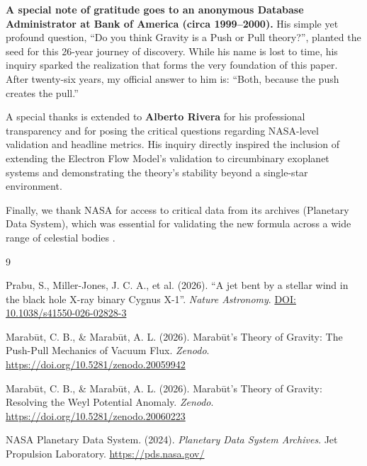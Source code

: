 \documentclass[11pt, a4paper]{article}
\newcommand{\doi}[1]{\href{https://doi.org/#1}{DOI: #1}}
\begin{document}
\textbf{A special note of gratitude goes to an anonymous Database Administrator at Bank of America (circa 1999–2000).} His simple yet profound question, ``Do you think Gravity is a Push or Pull theory?'', planted the seed for this 26-year journey of discovery. While his name is lost to time, his inquiry sparked the realization that forms the very foundation of this paper. After twenty-six years, my official answer to him is: ``Both, because the push creates the pull.''

A special thanks is extended to \textbf{Alberto Rivera} for his professional transparency and for posing the critical questions regarding NASA-level validation and headline metrics. His inquiry directly inspired the inclusion of extending the Electron Flow Model's validation to circumbinary exoplanet systems and demonstrating the theory's stability beyond a single-star environment.

Finally, we thank NASA for access to critical data from its archives (Planetary Data System), which was essential for validating the new formula across a wide range of celestial bodies \cite{nasa2024}.

\begin{thebibliography}{9}

  Prabu, S., Miller-Jones, J. C. A., et al. (2026). ``A jet bent by a stellar wind in the black hole X-ray binary Cygnus X-1''. \textit{Nature Astronomy}.
  \doi{10.1038/s41550-026-02828-3}

  Marab\={u}t, C. B., \& Marab\={u}t, A. L. (2026). Marab\={u}t's Theory of Gravity: The Push-Pull Mechanics of Vacuum Flux. \textit{Zenodo}.
  \url{https://doi.org/10.5281/zenodo.20059942}

  Marab\={u}t, C. B., \& Marab\={u}t, A. L. (2026). Marab\={u}t's Theory of Gravity: Resolving the Weyl Potential Anomaly. \textit{Zenodo}.
  \url{https://doi.org/10.5281/zenodo.20060223}

  NASA Planetary Data System. (2024). \textit{Planetary Data System Archives}. Jet Propulsion Laboratory. \url{https://pds.nasa.gov/}

\end{thebibliography}
\end{document}
